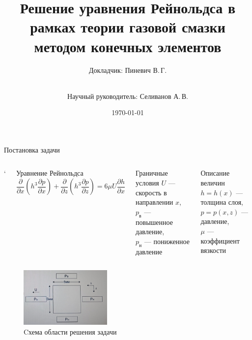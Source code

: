 \documentclass[ignoreonframetext,unicode]{beamer}
\title[Решение уравнения Рейнольдса]{Решение уравнения Рейнольдса в рамках теории газовой смазки методом конечных элементов}
\author[Пиневич В.\,Г.]{Докладчик: Пиневич В.\,Г.\and\\[0.5mm] Научный руководитель: Селиванов А.\,В.}
\institute[каф. Прикладная математика ФН-2]{группа ФН2-81Б}
\date{\today}
\begin{document}
	
	\begin{frame}[plain]
		\maketitle
	\end{frame}

	\begin{frame}{Постановка задачи}
		\vspace*{-4mm}
		\begin{columns}
			\column{\textwidth}`
			\begin{block}{Уравнение Рейнольдса}
			 \[
				\frac{\partial}{\partial x} \left(h^3 \frac{\partial p}{\partial x} \right) + \frac{\partial}{\partial z} \left(h^3 \frac{\partial p}{\partial z} \right) = 6 \mu U \frac{\partial h}{\partial x}
			 \]
			\end{block}

\vspace*{-2mm}
		\begin{columns}
			\begin{block}{Граничные условия}
				$U$ --- скорость в направлении $x$,\\ 
				$p_{\text{в}}$ --- повышенное давление,\\ 
				$p_{\text{н}}$ --- пониженное давление
			\end{block}
		
			\begin{block}{Описание величин}
			$h = h(x)$ --- толщина слоя, \\
			$p = p(x, z)$ --- давление, \\
			$\mu$ --- коэффициент вязкости
			\end{block}
		\end{columns}

		\end{columns}
		
		\begin{figure}[!htbp]
			\centering
			\includegraphics[width=0.4\textwidth]{taskGU}%
			\caption{Cхема области решения задачи}
			\vspace*{-2mm}
			\label{ser_graph}
		\end{figure}
		
	\end{frame}	
\end{document}
